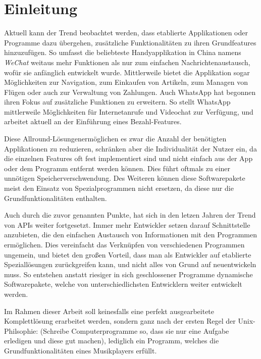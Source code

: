 
\chapter{Einleitung}
Aktuell kann der Trend beobachtet werden, dass etablierte Applikationen oder
Programme dazu übergehen, zusätzliche Funktionalitäten zu ihren Grundfeatures
hinzuzufügen. So umfasst die beliebteste Handyapplikation in China namens
\textit{WeChat} weitaus mehr Funktionen als nur zum einfachen
Nachrichtenaustausch, wofür sie anfänglich entwickelt wurde. Mittlerweile
bietet die Applikation sogar Möglichkeiten zur Navigation, zum
Einkaufen von Artikeln, zum Managen von Flügen oder auch zur Verwaltung von
Zahlungen. Auch WhatsApp hat begonnen ihren Fokus auf zusätzliche Funktionen zu
erweitern. So stellt WhatsApp mittlerweile Möglichkeiten für Internetanrufe und
Videochat zur Verfügung, und arbeitet aktuell an der Einführung eines
Bezahl-Features. \hfill \break


Diese \glqq Allround-Lösungen\grqq \space ermöglichen es zwar die Anzahl der
benötigten Applikationen zu reduzieren, schränken aber die Individualität der
Nutzer ein, da die einzelnen Features oft fest implementiert sind und nicht
einfach aus der App oder dem Programm entfernt werden können. Dies führt
oftmals zu einer unnötigen Speicherverschwendung. Des Weiteren können diese
Softwarepakete meist den Einsatz von Spezialprogrammen nicht ersetzen, da diese
nur die Grundfunktionalitäten enthalten. \hfill \break


Auch durch die zuvor genannten Punkte, hat sich in den letzen Jahren der Trend
von \acp{API} weiter fortgesetzt. Immer mehr Entwickler setzen darauf
Schnittstelle anzubieten, die den einfachen Austausch von Informationen mit den
Programmen ermöglichen. Dies vereinfacht das Verknüpfen von verschiedenen
Programmen ungemein, und bietet den großen Vorteil, dass man als Entwickler auf
etablierte Speziallösungen zurückgreifen kann, und nicht alles von Grund auf
neuentwickeln muss. So entstehen anstatt riesiger in sich geschlossener Programme
dynamische Softwarepakete, welche von unterschiedlichsten Entwicklern weiter
entwickelt werden. \hfill \break


Im Rahmen dieser Arbeit soll keinesfalls eine perfekt ausgearbeitete
Komplettlösung erarbeitet werden, sondern ganz nach der ersten Regel der
Unix-Philsophie: (\glqq Schreibe Computerprogramme so, dass sie nur eine
Aufgabe erledigen und diese gut machen\grqq), lediglich ein Programm, welches
die Grundfunktionalitäten eines Musikplayers erfüllt. \hfill \break


